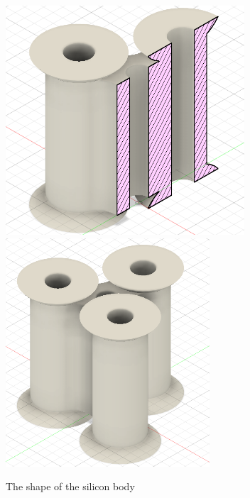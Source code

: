 \documentclass[twoside]{article}
\begin{document}
\begin{figure}[H] 
	\centering
	\includegraphics[scale=0.75]{silicon_body_half}
	\includegraphics[scale=0.75]{silicon_body}
	\caption{The shape of the silicon body}
\end{figure}
\end{document}
